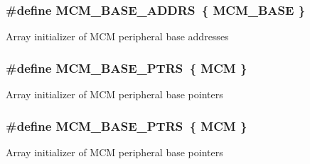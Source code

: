 \subsubsection[{\texorpdfstring{M\+C\+M\+\_\+\+B\+A\+S\+E\+\_\+\+A\+D\+D\+RS}{MCM_BASE_ADDRS}}]{\setlength{\rightskip}{0pt plus 5cm}\#define M\+C\+M\+\_\+\+B\+A\+S\+E\+\_\+\+A\+D\+D\+RS~\{ {\bf M\+C\+M\+\_\+\+B\+A\+SE} \}}\hypertarget{group__MCM__Peripheral__Access__Layer_ga240172b40ddf9d12c884fb331539f5e9}{}\label{group__MCM__Peripheral__Access__Layer_ga240172b40ddf9d12c884fb331539f5e9}
Array initializer of M\+CM peripheral base addresses 
\subsubsection[{\texorpdfstring{M\+C\+M\+\_\+\+B\+A\+S\+E\+\_\+\+P\+T\+RS}{MCM_BASE_PTRS}}]{\setlength{\rightskip}{0pt plus 5cm}\#define M\+C\+M\+\_\+\+B\+A\+S\+E\+\_\+\+P\+T\+RS~\{ {\bf M\+CM} \}}\hypertarget{group__MCM__Peripheral__Access__Layer_gae2d5e838ce7d2d4108738c05bf224272}{}\label{group__MCM__Peripheral__Access__Layer_gae2d5e838ce7d2d4108738c05bf224272}
Array initializer of M\+CM peripheral base pointers 
\subsubsection[{\texorpdfstring{M\+C\+M\+\_\+\+B\+A\+S\+E\+\_\+\+P\+T\+RS}{MCM_BASE_PTRS}}]{\setlength{\rightskip}{0pt plus 5cm}\#define M\+C\+M\+\_\+\+B\+A\+S\+E\+\_\+\+P\+T\+RS~\{ {\bf M\+CM} \}}\hypertarget{group__MCM__Peripheral__Access__Layer_gae2d5e838ce7d2d4108738c05bf224272}{}\label{group__MCM__Peripheral__Access__Layer_gae2d5e838ce7d2d4108738c05bf224272}
Array initializer of M\+CM peripheral base pointers 